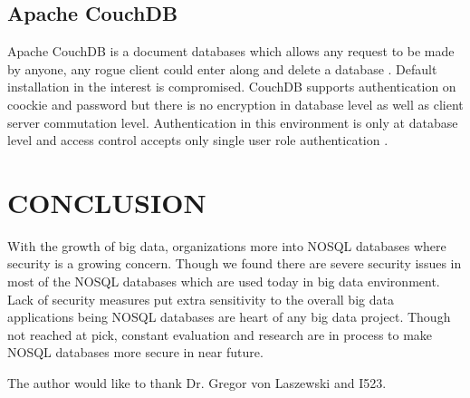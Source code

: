 \documentclass[sigconf]{acmart}
\begin{document}
\subsection{Apache CouchDB}
Apache CouchDB is a document databases which allows any request to be made by anyone, any rogue client could enter along and delete a database \cite{editor06}. Default installation in the interest is compromised. CouchDB supports authentication on coockie and password but there is no encryption in database level as well as client server commutation level. Authentication in this environment is only at database level and access control accepts only single user role authentication \cite{editor06}.

\section{CONCLUSION}
With the growth of big data, organizations more into NOSQL databases where security is a growing concern. Though we found there are severe security issues in most of the NOSQL databases which are used today in big data environment. Lack of security measures put extra sensitivity to the overall big data applications being NOSQL databases are heart of any big data project. Though not reached at pick, constant evaluation and research are in process to make NOSQL databases more secure in near future. 

\begin{acks}

  The author would like to thank Dr. Gregor von Laszewski and I523.

\end{acks}



 
\end{document}
